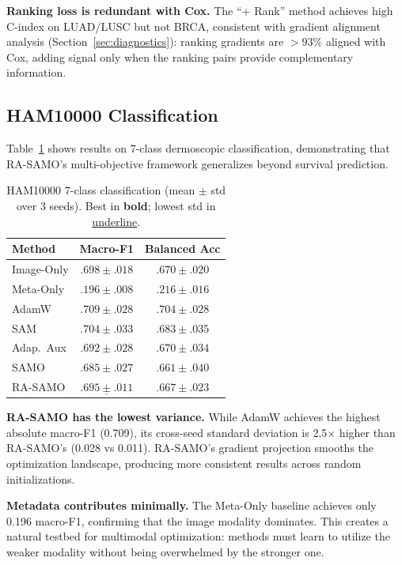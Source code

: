 \documentclass[10pt,twocolumn]{article}
\begin{document}
\textbf{Ranking loss is redundant with Cox.} The ``+ Rank'' method
achieves high C-index on LUAD/LUSC but not BRCA, consistent with
gradient alignment analysis (Section~\ref{sec:diagnostics}): ranking
gradients are $>93\%$ aligned with Cox, adding signal only when the
ranking pairs provide complementary information.

\subsection{HAM10000 Classification}
\label{sec:ham10000}

Table~\ref{tab:ham10000} shows results on 7-class dermoscopic
classification, demonstrating that RA-SAMO's multi-objective
framework generalizes beyond survival prediction.

\begin{table}[t]
\centering
\caption{HAM10000 7-class classification (mean $\pm$ std over 3
seeds). Best in \textbf{bold}; lowest std in \underline{underline}.}
\label{tab:ham10000}
\begin{tabular}{lcc}
\toprule
Method & Macro-F1 & Balanced Acc \\
\midrule
Image-Only & $.698 \pm .018$ & $.670 \pm .020$ \\
Meta-Only  & $.196 \pm .008$ & $.216 \pm .016$ \\
AdamW      & $\mathbf{.709} \pm .028$ & $\mathbf{.704} \pm .028$ \\
SAM        & $.704 \pm .033$ & $.683 \pm .035$ \\
Adap.\ Aux & $.692 \pm .028$ & $.670 \pm .034$ \\
SAMO       & $.685 \pm .027$ & $.661 \pm .040$ \\
RA-SAMO    & $\underline{.695 \pm .011}$ & $.667 \pm .023$ \\
\bottomrule
\end{tabular}
\end{table}

\textbf{RA-SAMO has the lowest variance.} While AdamW achieves the
highest absolute macro-F1 (0.709), its cross-seed standard
deviation is 2.5$\times$ higher than RA-SAMO's (0.028 vs 0.011).
RA-SAMO's gradient projection smooths the optimization landscape,
producing more consistent results across random initializations.

\textbf{Metadata contributes minimally.} The Meta-Only baseline
achieves only 0.196 macro-F1, confirming that the image modality
dominates. This creates a natural testbed for multimodal optimization:
methods must learn to utilize the weaker modality without being
overwhelmed by the stronger one.
\end{document}
